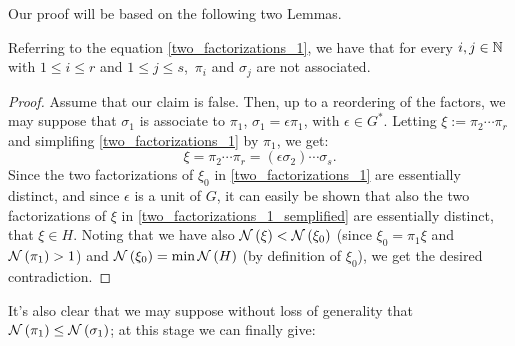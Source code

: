 Our proof will be based on the following two Lemmas.

\begin{lem}\label{lemmaFactorsNotAssociate}
Referring to the equation \eqref{two_factorizations_1},
we have that for every\/ $i,j \in \mathbb{N}$\/ with\/ $1 \leq i \leq r$\/ and\/
$1 \leq j \leq s$,\, $\pi_i$\/ and\/ $\sigma_j$\/ are not associated.
\end{lem}

\begin{proof}
%
Assume that our claim is false. Then, up to a reordering
of the factors, we may suppose that $\sigma_1$ is
associate to $\pi_1$, \ie $\sigma_1 = \epsilon \pi_1$,
with $\epsilon \in G^\ast$.
Letting $\xi := \pi_2 \cdots \pi_r$ and simplifing
\eqref{two_factorizations_1} by $\pi_1$, we get:
\begin{equation}\label{two_factorizations_1_semplified}
\xi = \pi_2\cdots\pi_r = (\epsilon\sigma_2)\cdots\sigma_s.
\end{equation}
Since the two factorizations of $\xi_0$ in
\eqref{two_factorizations_1} are essentially distinct,
and since $\epsilon$ is a unit of $G$, it can easily be
shown that also the two factorizations of $\xi$ in
\eqref{two_factorizations_1_semplified} are essentially
distinct, \ie that $\xi \in H.$
Noting that we have also $\mathcal{N}\left(\xi\right) < \mathcal{N}\left(\xi_0\right)$
(since $\xi_0 = \pi_1\xi$ and $\mathcal{N}\left(\pi_1\right) > 1$) and
$\mathcal{N}\left(\xi_0\right) = \min{\mathcal{N}\left(H\right)}$
(by definition of $\xi_0$), we get the desired
contradiction.
%
\end{proof}

It's also clear that we may suppose without loss of
generality that $\mathcal{N}\left(\pi_1\right) \le \mathcal{N}\left(\sigma_1\right)$;
at this stage we can finally give:

